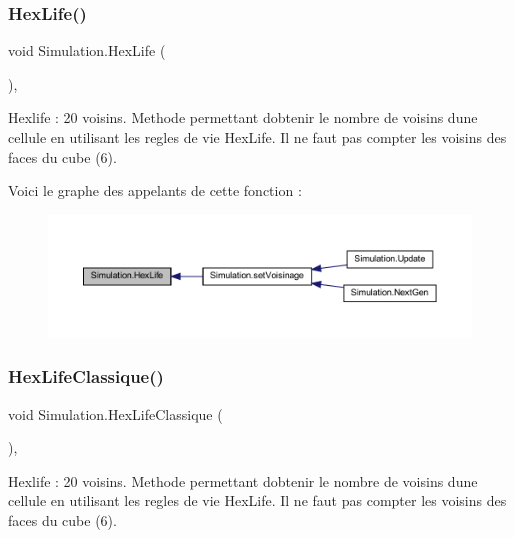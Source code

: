 \subsubsection{\texorpdfstring{Hex\+Life()}{HexLife()}}
{\footnotesize\ttfamily void Simulation.\+Hex\+Life (\begin{DoxyParamCaption}{ }\end{DoxyParamCaption})\hspace{0.3cm}{\ttfamily [inline]}, {\ttfamily [private]}}



Hexlife \+: 20 voisins. Methode permettant d\textquotesingle{}obtenir le nombre de voisins d\textquotesingle{}une cellule en utilisant les regles de vie Hex\+Life. Il ne faut pas compter les voisins des faces du cube (6). 

Voici le graphe des appelants de cette fonction \+:\nopagebreak
\begin{figure}[H]
\begin{center}
\leavevmode
\includegraphics[width=350pt]{class_simulation_ade3470a637773f3e751ce4b0923c3909_icgraph}
\end{center}
\end{figure}
\mbox{\label{class_simulation_a20934920a4fc75fa258a85d0c4e6968e}} 
\subsubsection{\texorpdfstring{Hex\+Life\+Classique()}{HexLifeClassique()}}
{\footnotesize\ttfamily void Simulation.\+Hex\+Life\+Classique (\begin{DoxyParamCaption}{ }\end{DoxyParamCaption})\hspace{0.3cm}{\ttfamily [inline]}, {\ttfamily [private]}}



Hexlife \+: 20 voisins. Methode permettant d\textquotesingle{}obtenir le nombre de voisins d\textquotesingle{}une cellule en utilisant les regles de vie Hex\+Life. Il ne faut pas compter les voisins des faces du cube (6). 

